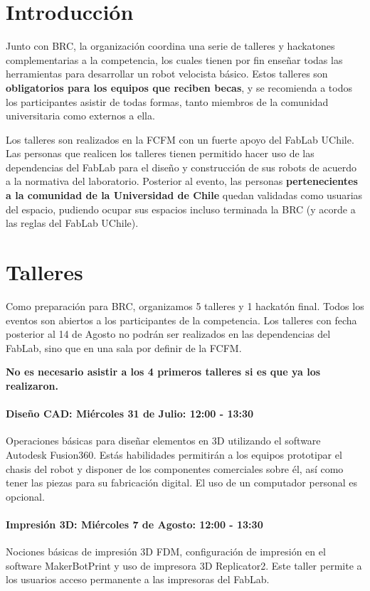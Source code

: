 \pagebreak

\section{Introducción}

Junto con BRC, la organización coordina una serie de talleres y hackatones complementarias a la competencia, los cuales tienen por fin enseñar todas las herramientas para desarrollar un robot velocista básico. Estos talleres son \textbf{obligatorios para los equipos que reciben becas}, y se recomienda a todos los participantes asistir de todas formas, tanto miembros de la comunidad universitaria como externos a ella. 

Los talleres son realizados en la FCFM con un fuerte apoyo del FabLab UChile. 
Las personas que realicen los talleres tienen permitido hacer uso de las dependencias del FabLab para el diseño y construcción de sus robots de acuerdo a la normativa del laboratorio.
Posterior al evento, las personas \textbf{pertenecientes a la comunidad de la Universidad de Chile} quedan validadas como usuarias del espacio, pudiendo ocupar sus espacios incluso terminada la BRC (y acorde a las reglas del FabLab UChile).

\section{Talleres}

Como preparación para BRC, organizamos 5 talleres y 1 hackatón final.
Todos los eventos son abiertos a los participantes de la competencia.
Los talleres con fecha posterior al 14 de Agosto no podrán ser realizados en las dependencias del FabLab, sino que en una sala por definir de la FCFM.

\textbf{No es necesario asistir a los 4 primeros talleres si es que ya los realizaron.}

\paragraph*{Diseño CAD: Miércoles 31 de Julio: 12:00 - 13:30}
Operaciones básicas para diseñar elementos en 3D utilizando el software Autodesk Fusion360.
Estás habilidades permitirán a los equipos prototipar el chasis del robot y disponer de los componentes comerciales sobre él, así como tener las piezas para su fabricación digital.
El uso de un computador personal es opcional.

\paragraph*{Impresión 3D: Miércoles 7 de Agosto: 12:00 - 13:30}
Nociones básicas de impresión 3D FDM, configuración de impresión en el software MakerBotPrint y uso de impresora 3D Replicator2.
Este taller permite a los usuarios acceso permanente a las impresoras del FabLab.

